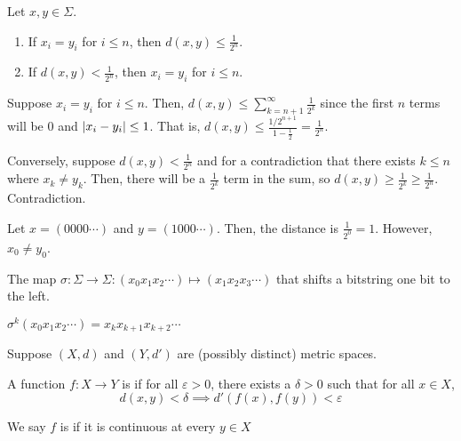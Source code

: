\documentclass[class=pmath370,tikz,notes]{agony}
\begin{document}
\begin{prop}\label{prop:bsd}
  Let $x,y \in \Sigma$.
  \begin{enumerate}[nosep]
    \item If $x_i = y_i$ for $i \leq n$, then $d(x,y) \leq \frac{1}{2^n}$.
    \item If $d(x,y) < \frac{1}{2^n}$, then $x_i = y_i$ for $i \leq n$.
  \end{enumerate}
\end{prop}
\begin{prf}
  Suppose $x_i = y_i$ for $i \leq n$.
  Then, $d(x,y) \leq \sum_{k=n+1}^\infty \frac{1}{2^k}$
  since the first $n$ terms will be 0 and $\abs{x_i-y_i} \leq 1$.
  That is, $d(x,y) \leq \frac{1/2^{n+1}}{1-\frac12} = \frac{1}{2^n}$.

  Conversely, suppose $d(x,y) < \frac{1}{2^n}$
  and for a contradiction that there exists $k \leq n$ where $x_k \neq y_k$.
  Then, there will be a $\frac{1}{2^k}$ term in the sum,
  so $d(x,y) \geq \frac{1}{2^k} \geq \frac{1}{2^n}$. Contradiction.
\end{prf}

\begin{example}
  Let $x = (0000\cdots)$ and $y = (1000\cdots)$.
  Then, the distance is $\frac{1}{2^0} = 1$.
  However, $x_0 \neq y_0$.
\end{example}

\begin{defn}
  The map $\sigma : \Sigma \to \Sigma : (x_0x_1x_2\cdots) \mapsto (x_1x_2x_3\cdots)$
  that shifts a bitstring one bit to the left.
\end{defn}

\begin{remark}
  $\sigma^k(x_0x_1x_2\cdots) = x_k x_{k+1}x_{k+2} \cdots$
\end{remark}

\begin{defn*}
  Suppose $(X,d)$ and $(Y,d')$ are (possibly distinct) metric spaces.

  A function $f : X \to Y$ is 
  if for all $\varepsilon > 0$, there exists a $\delta > 0$
  such that for all $x \in X$,
  \[ d(x,y) < \delta \implies d'(f(x),f(y)) < \varepsilon \]

  We say $f$ is  if it is continuous at every $y \in X$
\end{defn*}
\end{document}
